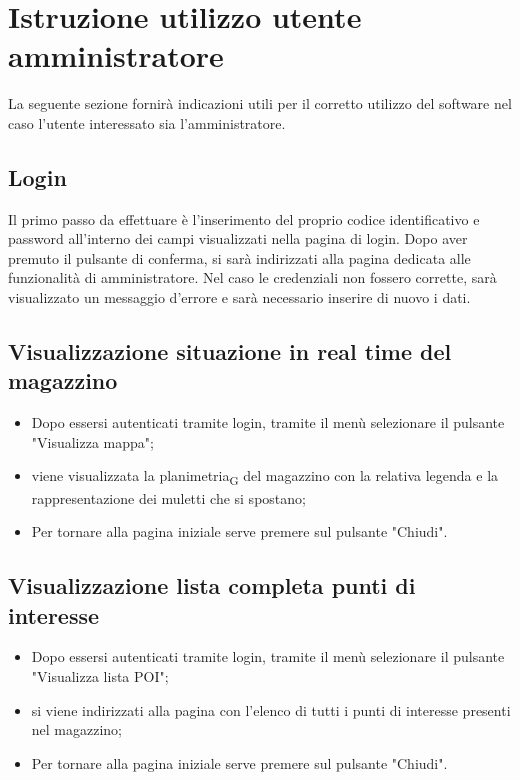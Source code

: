 \section{Istruzione utilizzo utente amministratore}

La seguente sezione fornirà indicazioni utili per il corretto utilizzo del software nel caso l'utente interessato sia l'amministratore.

\subsection{Login}
Il primo passo da effettuare è l'inserimento del proprio codice identificativo e password all'interno dei campi visualizzati nella pagina di login. Dopo aver premuto il pulsante di conferma, si sarà indirizzati alla pagina dedicata alle funzionalità di amministratore. Nel caso le credenziali non fossero corrette, sarà visualizzato un messaggio d'errore e sarà necessario inserire di nuovo i dati.

\subsection{Visualizzazione situazione in real time del magazzino}
\begin{itemize}
    \item Dopo essersi autenticati tramite login, tramite il menù selezionare il pulsante "Visualizza mappa";
    \item viene visualizzata la planimetria\textsubscript{G} del magazzino con la relativa legenda e la rappresentazione dei muletti che si spostano;
    \item Per tornare alla pagina iniziale serve premere sul pulsante "Chiudi".
\end{itemize}
\subsection{Visualizzazione lista completa punti di interesse}
\begin{itemize}
    \item Dopo essersi autenticati tramite login, tramite il menù selezionare il pulsante "Visualizza lista POI";
    \item si viene indirizzati alla pagina con l'elenco di tutti i punti di interesse presenti nel magazzino;
    \item Per tornare alla pagina iniziale serve premere sul pulsante "Chiudi".
\end{itemize}
